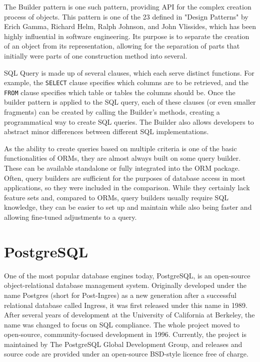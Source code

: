 The Builder pattern is one such pattern, providing API for the complex creation
process of objects. This pattern is one of the 23 defined in "Design Patterns"
by Erich Gamma, Richard Helm, Ralph Johnson, and John Vlissides, which has been
highly influential in software engineering. Its purpose is to separate the
creation of an object from its representation, allowing for the separation of
parts that initially were parts of one construction method into several.

SQL Query is made up of several clauses, which each serve distinct functions.
For example, the \texttt{SELECT} clause specifies which columns are to be
retrieved, and the \texttt{FROM} clause specifies which table or tables the
columns should be. Once the builder pattern is applied to the SQL query, each of
these clauses (or even smaller fragments) can be created by calling the
Builder's methods, creating a programmatical way to create SQL queries. The
Builder also allows developers to abstract minor differences between different
SQL implementations.

As the ability to create queries based on multiple criteria is one of the basic
functionalities of ORMs, they are almost always built on some query builder.
These can be available standalone or fully integrated into the ORM package.
Often, query builders are sufficient for the purposes of database access in most
applications, so they were included in the comparison. While they certainly lack
feature sets and, compared to ORMs, query builders usually require SQL
knowledge, they can be easier to set up and maintain while also being faster and
allowing fine-tuned adjustments to a query.

\section{PostgreSQL}
One of the most popular database engines today, PostgreSQL, is an open-source
object-relational database management system. Originally developed under the
name Postgres (short for Post-Ingres) as a new generation after a successful
relational database called Ingress, it was first released under this name in
1989. After several years of development at the University of California at
Berkeley, the name was changed to focus on SQL compliance. The whole project
moved to open-source, community-focused development in 1996. Currently, the
project is maintained by The PostgreSQL Global Development Group, and releases
and source code are provided under an open-source BSD-style licence free of
charge.

